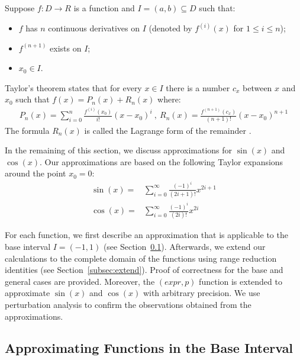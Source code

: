 \documentclass{article}
\numberwithin{mytheorem}{section}
\newcommand{\taylorsin}[3] {\sum_{i=#1}^{#2}\frac{(-1)^i}{(2i+1)!}{#3}^{2i+1}}
\newcommand{\taylorcos}[3] {\sum_{i=#1}^{#2}\frac{(-1)^i}{(2i)!}{#3}^{2i}}
\begin{document}
Suppose $f: D\rightarrow R$ is a function  and $I=(a,b)\subseteq D$ such that:
\begin{itemize}
\item
$f$ has $n$ continuous derivatives on $I$ (denoted by $f^{(i)}(x)$ for $1\leq i\leq n$);
\item
$f^{(n+1)}$ exists on $I$;
\item
$x_0\in I$. 
\end{itemize}  Taylor's theorem states that for every $x\in I$
there is a number $c_x$ between $x$ and $x_0$ such that $f(x)=P_n(x)+R_n(x)$ where: 
\begin{align}
P_n(x)=\sum_{i=0}^n\frac{f^{(i)}(x_0)}{i!}(x-x_0)^i~,~R_n(x)=\frac{f^{(n+1)}(c_x)}{(n+1)!}(x-x_0)^{n+1}\label{eqn:taylor}
\end{align}
The formula $R_n(x)$ is called the Lagrange form of the remainder \cite{S67}. 

 
In the remaining of this section, we discuss approximations for $\sin(x)$ and $\cos(x)$. Our approximations are based on the following Taylor expansions around the point $x_0=0$: 
\begin{align}
\sin(x)=&\taylorsin{0}{\infty}{x} \label{eqn:taylor_sin}\\
\cos(x)=&\taylorcos{0}{\infty}{x}\label{eqn:taylor_cos}
\end{align}


For each function, we first describe an approximation that is applicable to the base interval $I=(-1,1)$ (see Section~\ref{subsec:base}). Afterwards, we extend our calculations to the complete domain of the functions using range reduction identities (see Section~\ref{subsec:extend}). Proof of correctness for the base and general cases are provided. Moreover, the $(expr,p)$ function is extended to approximate $\sin(x)$ and $\cos(x)$ with arbitrary precision. We use perturbation analysis to confirm the observations obtained from the approximations. 
 
 
\subsection{Approximating Functions in the Base Interval}\label{subsec:base}
\end{document}
